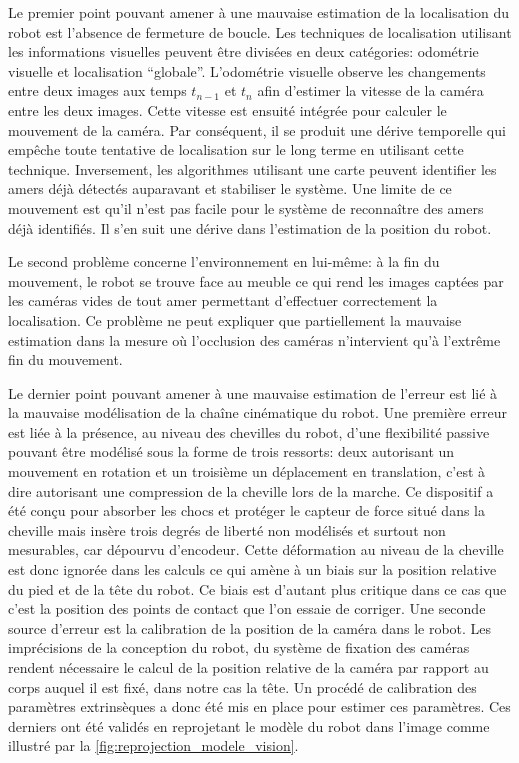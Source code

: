 Le premier point pouvant amener à une mauvaise estimation de la
localisation du robot est l'absence de fermeture de boucle. Les
techniques de localisation utilisant les informations visuelles
peuvent être divisées en deux catégories: odométrie
visuelle et localisation
``globale''. L'odométrie visuelle observe les changements entre deux
images aux temps $t_{n-1}$ et $t_n$ afin d'estimer la vitesse de la
caméra entre les deux images. Cette vitesse est ensuité intégrée pour
calculer le mouvement de la caméra. Par conséquent, il se produit une
dérive temporelle qui empêche toute tentative de localisation sur le
long terme en utilisant cette technique. Inversement, les algorithmes
utilisant une carte peuvent identifier les amers déjà détectés
auparavant et stabiliser le système. Une limite de ce mouvement est
qu'il n'est pas facile pour le système de reconnaître des amers déjà
identifiés. Il s'en suit une dérive dans l'estimation de la position
du robot.


Le second problème concerne l'environnement en lui-même: à la fin du
mouvement, le robot se trouve face au meuble ce qui rend les images
captées par les caméras vides de tout amer permettant d'effectuer
correctement la localisation. Ce problème ne peut expliquer que
partiellement la mauvaise estimation dans la mesure où l'occlusion des
caméras n'intervient qu'à l'extrême fin du mouvement.


Le dernier point pouvant amener à une mauvaise estimation de l'erreur
est lié à la mauvaise modélisation de la chaîne cinématique du
robot. Une première erreur est liée à la présence, au niveau des
chevilles du robot, d'une flexibilité passive pouvant être modélisé
sous la forme de trois ressorts: deux autorisant un mouvement en
rotation et un troisième un déplacement en translation, c'est à dire
autorisant une compression de la cheville lors de la marche. Ce
dispositif a été conçu pour absorber les chocs et protéger le capteur
de force situé dans la cheville mais insère trois degrés de liberté
non modélisés et surtout non mesurables, car dépourvu
d'encodeur. Cette déformation au niveau de la cheville est donc
ignorée dans les calculs ce qui amène à un biais sur la position
relative du pied et de la tête du robot. Ce biais est d'autant plus
critique dans ce cas que c'est la position des points de contact que
l'on essaie de corriger. Une seconde source d'erreur est la
calibration de la position de la caméra dans le robot. Les
imprécisions de la conception du robot, du système de fixation des
caméras rendent nécessaire le calcul de la position relative de la
caméra par rapport au corps auquel il est fixé, dans notre cas la
tête. Un procédé de calibration des paramètres
extrinsèques a donc été
mis en place pour estimer ces paramètres. Ces derniers ont été validés
en reprojetant le modèle du robot dans l'image comme illustré par la
\autoref{fig:reprojection_modele_vision}.


